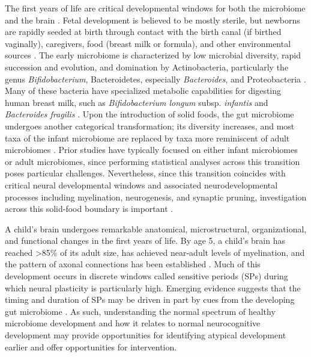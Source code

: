 \documentclass{article}
\begin{document}
The first years of life are critical developmental windows for both the
microbiome and the brain
\cite{laueDevelopingMicrobiomeBirth2022}.
Fetal development is believed to be mostly sterile, but newborns
are rapidly seeded at birth through contact with the birth canal (if
birthed vaginally), caregivers, food (breast milk or formula),
and other environmental sources
\cite{backhedDynamicsStabilizationHuman2015,bokulichAntibioticsBirthMode2016}.
The early microbiome is characterized by low microbial
diversity, rapid succession and evolution, and domination by
Actinobacteria, particularly the genus \emph{Bifidobacterium},
Bacteroidetes, especially \emph{Bacteroides}, and Proteobacteria
\cite{koenigSuccessionMicrobialConsortia2011}.
Many of these bacteria have specialized metabolic capabilities
for digesting human breast milk, such as \emph{Bifidobacterium longum}
subsp. \textit{infantis} and \emph{Bacteroides fragilis}
\cite{selaGenomeSequenceBifidobacterium2008}.
Upon the introduction of solid foods, the gut
microbiome undergoes another categorical transformation;
its diversity increases, and most taxa of the infant microbiome
are replaced by taxa more reminiscent of adult microbiomes
\cite{backhedDynamicsStabilizationHuman2015}.
Prior studies have typically focused on either infant microbiomes or
adult microbiomes, since performing statistical analyses across this
transition poses particular challenges. Nevertheless, since this
transition coincides with critical neural developmental windows and
associated neurodevelopmental processes including myelination, neurogenesis, and synaptic pruning,
investigation across this solid-food boundary is important
\cite{tauNormalDevelopmentBrain2010}.

A child's brain undergoes remarkable anatomical, microstructural,
organizational, and functional changes in the first years of life. By
age 5, a child's brain has reached \textgreater85\% of its adult size,
has achieved near-adult levels of myelination, and the pattern of axonal
connections has been established
\cite{silbereisCellularMolecularLandscapes2016}.
Much of this development occurs in discrete windows called
sensitive periods (SPs)
\cite{knudsenSensitivePeriodsDevelopment2004}
during which neural plasticity is particularly high.
Emerging evidence suggests that the timing and duration of SPs
may be driven in part by cues from the developing gut microbiome
\cite{callaghanNestedSensitivePeriods2020,cowanAnnualResearchReview2020}.
As such, understanding the normal spectrum of healthy microbiome
development and how it relates to normal neurocognitive development may
provide opportunities for identifying atypical development earlier and
offer opportunities for intervention.
\end{document}
